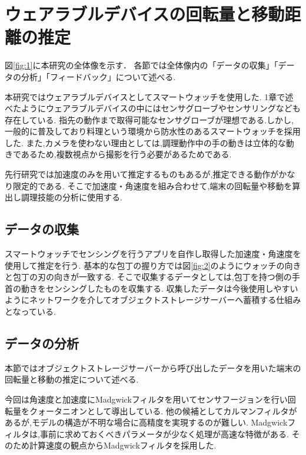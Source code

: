 \section{ウェアラブルデバイスの回転量と移動距離の推定}
図\ref{fig:1}に本研究の全体像を示す．
各節では全体像内の「データの収集」「データの分析」「フィードバック」について述べる.

本研究ではウェアラブルデバイスとしてスマートウォッチを使用した.
1章で述べたようにウェアラブルデバイスの中にはセンサグローブやセンサリングなども存在している.
指先の動作まで取得可能なセンサグローブが理想である.しかし,一般的に普及しており料理という環境から防水性のあるスマートウォッチを採用した.
また,カメラを使わない理由としては,調理動作中の手の動きは立体的な動きであるため,複数視点から撮影を行う必要があるためである.

先行研究\cite{kumazawaanalysis}では加速度のみを用いて推定するものもあるが,推定できる動作がかなり限定的である.
そこで加速度・角速度を組み合わせて,端末の回転量や移動を算出し調理技能の分析に使用する.


\subsection{データの収集}
スマートウォッチでセンシングを行うアプリを自作し取得した加速度・角速度を使用して推定を行う.
基本的な包丁の握り方では図\ref{fig:2}のようにウォッチの向きと包丁の刃の向きが一致する.
そこで収集するデータとしては,包丁を持つ側の手首の動きをセンシングしたものを収集する.
収集したデータは今後使用しやすいようにネットワークを介してオブジェクトストレージサーバーへ蓄積する仕組みとなっている.
\subsection{データの分析}
本節ではオブジェクトストレージサーバーから呼び出したデータを用いた端末の回転量と移動の推定について述べる.

今回は角速度と加速度にMadgwickフィルタを用いてセンサフージョンを行い回転量をクォータニオンとして導出している.
他の候補としてカルマンフィルタがあるが,モデルの構造が不明な場合に高精度を実現するのが難しい.
Madgwickフィルタは,事前に求めておくべきパラメータが少なく処理が高速な特徴がある.
そのため計算速度の観点からMadgwickフィルタを採用した.

